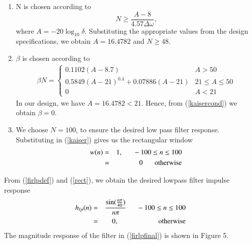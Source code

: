 \documentclass{article}
\begin{document}
\begin{enumerate}
\item  N is chosen according to
\begin{equation}
N \geq \frac{A-8}{4.57\Delta \omega},
\end{equation}
where $A = -20\log_{10}\delta$.  Substituting the appropriate values from the design specifications, we obtain
$A = 16.4782$ and $N \geq 48$.

\item  $\beta$ is chosen according to
\begin{eqnarray}
\label{kaisercond}
\beta N = \left\{ \begin{array}{ll} 0.1102(A-8.7) & A > 50 \\
0.5849(A-21)^{0.4}+ 0.07886(A-21) & 21 \leq A \leq 50 \\
0 & A < 21\end{array} \right.
\end{eqnarray}
In our design, we have $A = 16.4782 < 21$.  Hence, from (\ref{kaisercond}) we obtain $\beta = 0$.  

\item We choose $N = 100$, to ensure the desired low pass filter response.  Substituting in (\ref{kaiser})
gives us the rectangular window
\begin{eqnarray}
\label{rect}
w(n) &=& 1, \indent -100 \leq n \leq 100 \nonumber \\
&=& 0 \hspace{6mm} \mbox{otherwise}
\end{eqnarray}
\end{enumerate}

From (\ref{firlpdef}) and (\ref{rect}), we obtain the desired lowpass filter impulse response
\begin{eqnarray}
\label{firlpfinal}
h_{lp}(n) &=& \frac{\sin(\frac{n\pi}{40})}{n\pi} \indent -100 \leq n \leq 100 \nonumber \\
&=& 0, \hspace{2cm} \mbox{otherwise}
\end{eqnarray}
The magnitude  response of the filter in (\ref{firlpfinal}) is shown in Figure 5.
\end{document}
